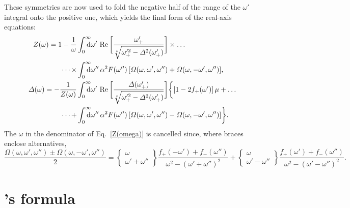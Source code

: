 These symmetries are now used to fold the negative half of the range of the
$\omega'$ integral onto the positive one, which yields the final form of the
real-axis  equations:
%
\begin{subequations} \label{real-axis Eliashberg equations}
    \begin{align} \notag
        Z(\omega) = 1 - \frac 1 \omega
        &\int \from 0 \till \infty \D \omega' \,
        \Re \bigg[
            \frac{\omega'_+}{\sqrt[*]{\omega'^2_+ - \Delta^2(\omega'_+)}}
        \bigg]
        \times \dots
        \\ \label{Z(omega)}
        \dots \times
        &\int \from 0 \till \infty \D \omega'' \, \alpha^2 F(\omega'') \,
        [ \Omega(\omega,  \omega', \omega'')
        + \Omega(\omega, -\omega', \omega'') ],
        \\ \notag
        \Delta(\omega) = -\frac 1 {Z(\omega)}
        &\int \from 0 \till \infty \D \omega' \,
        \Re \bigg[ \frac
            {\Delta(\omega'_+)}
            {\sqrt[*]{\omega'^2_+ - \Delta^2(\omega'_+)}}
        \bigg]
        \bigg \{
            [1 - 2 f_+(\omega')] \, \mu
            + \dots
            \\
            \dots +
            &\int \from 0 \till \infty \D \omega'' \, \alpha^2 F(\omega'') \,
            [ \Omega(\omega,  \omega', \omega'')
            - \Omega(\omega, -\omega', \omega'') ]
        \bigg \}.
    \end{align}
\end{subequations}
%
The $\omega$ in the denominator of Eq.~\ref{Z(omega)} is cancelled since, where
braces enclose alternatives,
%
\begin{equation*}
    \frac {
        \Omega(\omega,  \omega', \omega'') \pm
        \Omega(\omega, -\omega', \omega'')
        } 2
    = \begin{Bmatrix} \omega \\ \omega' + \omega'' \end{Bmatrix}
    \frac
        {f_+(-\omega') + f_-(\omega'')}
        {\omega^2 -(\omega' + \omega'')^2}
    + \begin{Bmatrix} \omega \\ \omega' - \omega'' \end{Bmatrix}
    \frac
        {f_+(\omega') + f_-(\omega'')}
        {\omega^2 -(\omega' - \omega'')^2}.
\end{equation*}

\section{'s formula}

